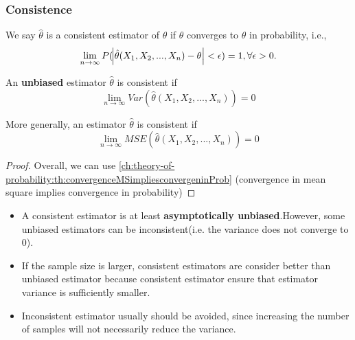 \begin{refsection}
\begin{example}
\begin{itemize}
	\end{itemize}
	
\end{example}



\subsubsection{Consistence} 

\begin{definition}
We say $\hat{\theta}$ is a consistent estimator of $\theta$ if $\hat{\theta}$ converges to $\theta$ in probability, i.e., 
$$\lim_{n\to \infty} P(\abs{\hat{\theta}(X_1,X_2,...,X_n)-\theta} < \epsilon) = 1,\forall \epsilon > 0.$$
\end{definition}

\begin{theorem}
An \textbf{unbiased} estimator $\hat{\theta}$ is consistent if $$\lim_{n\to \infty} Var(\hat{\theta}(X_1,X_2,...,X_n)) = 0$$

More generally, an estimator $\hat{\theta}$ is consistent if $$\lim_{n\to \infty} MSE(\hat{\theta}(X_1,X_2,...,X_n)) = 0$$

\end{theorem}
\begin{proof}
Overall, we can use \autoref{ch:theory-of-probability:th:convergenceMSimpliesconvergeninProb} (convergence in mean square implies convergence in probability)

\end{proof}
 
\begin{remark}\label{ch:theory-of-statistics:remark:consistentVsUnbiasedEstimator}\hfill
	\begin{itemize}
		\item A consistent estimator is at least \textbf{asymptotically unbiased}.However, some unbiased estimators can be inconsistent(i.e. the variance does not converge to 0).
		\item If the sample size is larger, consistent estimators are consider better than unbiased estimator because consistent estimator ensure that estimator variance is sufficiently smaller. 
		\item Inconsistent estimator usually should be avoided, since increasing the number of samples will not necessarily reduce the variance.
	\end{itemize}
\end{remark}


\end{refsection}

